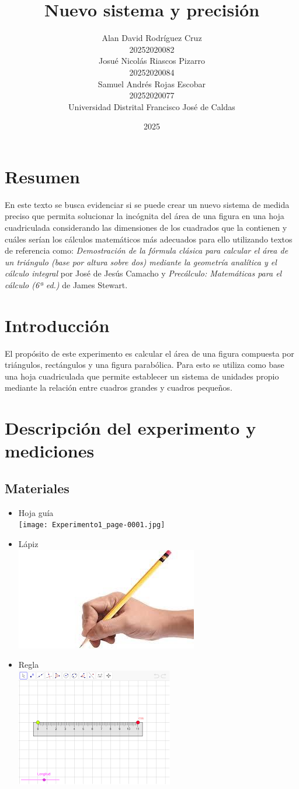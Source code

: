 \documentclass[12pt]{article}
\title{Nuevo sistema y precisión}
\author{Alan David Rodríguez Cruz\\ 20252020082 \\ Josué Nicolás Riascos Pizarro \\ 20252020084 \\ Samuel Andrés Rojas Escobar \\ 20252020077 \\ Universidad Distrital Francisco José de Caldas}
\date{2025}
\begin{document}
\maketitle

\section*{Resumen}
En este texto se busca evidenciar si se puede crear un nuevo sistema de medida preciso que permita solucionar la incógnita del área de una figura en una hoja cuadriculada considerando las dimensiones de los cuadrados que la contienen y cuáles serían los cálculos matemáticos más adecuados para ello utilizando textos de referencia como: \textit{Demostración de la fórmula clásica para calcular el área de un triángulo (base por altura sobre dos) mediante la geometría analítica y el cálculo integral} por José de Jesús Camacho y \textit{Precálculo: Matemáticas para el cálculo (6ª ed.)} de James Stewart.

\section*{Introducción}
El propósito de este experimento es calcular el área de una figura compuesta por triángulos, rectángulos y una figura parabólica. Para esto se utiliza como base una hoja cuadriculada que permite establecer un sistema de unidades propio mediante la relación entre cuadros grandes y cuadros pequeños.

\section{Descripción del experimento y mediciones}
\subsection{Materiales}

\begin{itemize}
    \item Hoja guía \\
    \texttt{[image: Experimento1\_page-0001.jpg]}

    \item Lápiz \\
    \includegraphics[width=0.25\linewidth]{page2_img2.jpeg}

    \item Regla \\
    \includegraphics[width=0.25\linewidth]{page2_img3.png}
\end{itemize}
\end{document}
